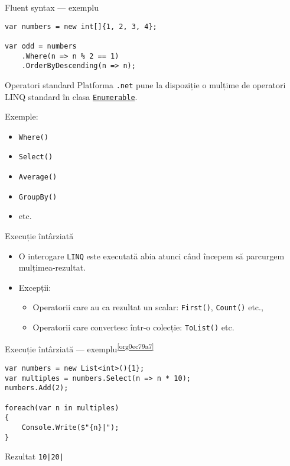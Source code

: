 \documentclass[presentation]{beamer}
\begin{document}
\begin{frame}[label={sec:orgdd5c1f2},fragile]{Fluent syntax --- exemplu}
 \begin{verbatim}
var numbers = new int[]{1, 2, 3, 4};

var odd = numbers
    .Where(n => n % 2 == 1)
    .OrderByDescending(n => n);
\end{verbatim}
\end{frame}
\begin{frame}[label={sec:org4b20dfb},fragile]{Operatori standard}
 Platforma \texttt{.net} pune la dispoziție o mulțime de \alert{operatori LINQ standard} în clasa \href{https://docs.microsoft.com/en-us/dotnet/api/system.linq.enumerable?view=netcore-3.1}{\texttt{Enumerable}}.


Exemple:
\begin{itemize}
\item \texttt{Where()}
\item \texttt{Select()}
\item \texttt{Average()}
\item \texttt{GroupBy()}
\item etc.
\end{itemize}
\end{frame}
\begin{frame}[label={sec:org00c2d83},fragile]{Execuție întârziată}
 \begin{itemize}
\item O interogare \texttt{LINQ} este executată abia atunci când începem să parcurgem mulțimea-rezultat.
\item Excepții:
\begin{itemize}
\item Operatorii care au ca rezultat un scalar: \texttt{First()}, \texttt{Count()} etc.,
\item Operatorii care convertesc într-o colecție: \texttt{ToList()} etc.
\end{itemize}
\end{itemize}
\end{frame}
\begin{frame}[label={sec:orge0d991a},fragile]{Execuție întârziată --- exemplu\textsuperscript{\ref{org0ec79a7}}}
 \begin{verbatim}
var numbers = new List<int>(){1};
var multiples = numbers.Select(n => n * 10);
numbers.Add(2);

foreach(var n in multiples)
{
    Console.Write($"{n}|");
}
\end{verbatim}
\begin{block}{Rezultat}
\texttt{10|20|}
\end{block}
\end{frame}
\end{document}
